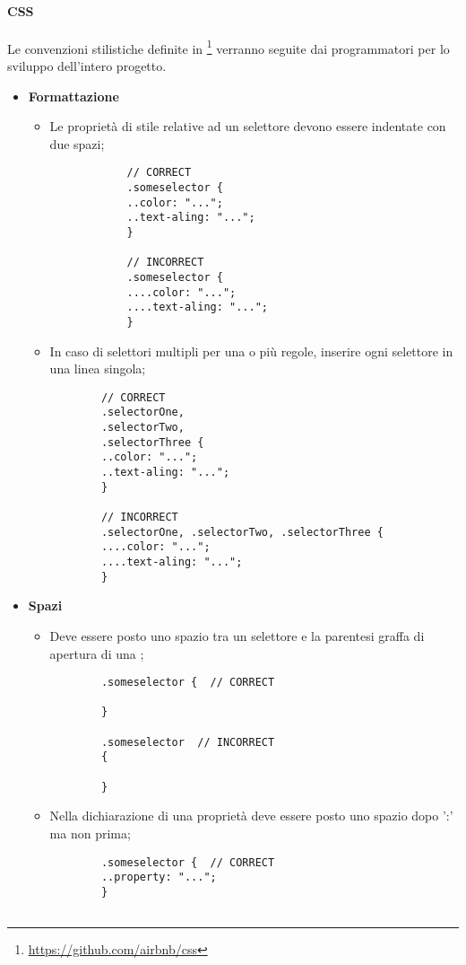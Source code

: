 \paragraph{CSS}\Spazio
Le convenzioni stilistiche definite in \footnote{\url{https://github.com/airbnb/css}} verranno seguite dai programmatori per lo sviluppo dell'intero progetto.

\begin{itemize}
	\item{\textbf{Formattazione}}
	\begin{itemize}
		\item{Le proprietà di stile relative ad un selettore devono essere indentate con due spazi;}
		\begin{lstlisting}
			// CORRECT
			.someselector {  
			..color: "...";
			..text-aling: "...";
			}
			
			// INCORRECT
			.someselector {  
			....color: "...";
			....text-aling: "...";
			}	
		\end{lstlisting}
		
		\item{In caso di selettori multipli per una o più regole, inserire ogni selettore in una linea singola;}
		\begin{lstlisting}
		// CORRECT
		.selectorOne,
		.selectorTwo,
		.selectorThree {  
		..color: "...";
		..text-aling: "...";
		}
		
		// INCORRECT
		.selectorOne, .selectorTwo, .selectorThree {  
		....color: "...";
		....text-aling: "...";
		}	
		\end{lstlisting}
	\end{itemize} 
	\item{\textbf{Spazi}}
	\begin{itemize}
		\item{Deve essere posto uno spazio tra un selettore e la parentesi graffa di apertura di una ;}
		\begin{lstlisting}
		.someselector {  // CORRECT
		
		}
		
		.someselector  // INCORRECT
		{  
		
		}
		\end{lstlisting}
		\item{Nella dichiarazione di una proprietà deve essere posto uno spazio dopo ':' ma non prima;}
		\begin{lstlisting}
		.someselector {  // CORRECT
		..property: "...";
		}
		

\end{lstlisting}
\end{itemize}
\end{itemize}
